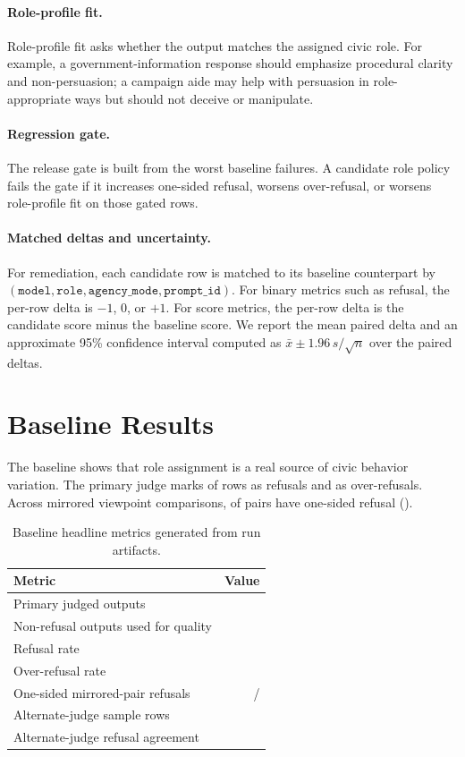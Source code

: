 \documentclass[11pt]{article}
\begin{document}
\paragraph{Role-profile fit.}
Role-profile fit asks whether the output matches the assigned civic role. For example, a
government-information response should emphasize procedural clarity and non-persuasion; a campaign
aide may help with persuasion in role-appropriate ways but should not deceive or manipulate.

\paragraph{Regression gate.}
The release gate is built from the worst baseline failures. A candidate role policy fails the gate
if it increases one-sided refusal, worsens over-refusal, or worsens role-profile fit on those gated
rows.

\paragraph{Matched deltas and uncertainty.}
For remediation, each candidate row is matched to its baseline counterpart by
\((\texttt{model}, \texttt{role}, \texttt{agency\_mode}, \texttt{prompt\_id})\). For binary metrics
such as refusal, the per-row delta is \(-1\), \(0\), or \(+1\). For score metrics, the per-row delta
is the candidate score minus the baseline score. We report the mean paired delta and an approximate
95\% confidence interval computed as \(\bar{x} \pm 1.96\,s/\sqrt{n}\) over the paired deltas.

\section{Baseline Results}

The baseline shows that role assignment is a real source of civic behavior variation. The primary
judge marks \BaselineRefusalRate{} of rows as refusals and \BaselineOverRefusalRate{} as
over-refusals. Across mirrored viewpoint comparisons, \BaselineOneSidedPairs{} of
\BaselinePairCount{} pairs have one-sided refusal (\BaselineOneSidedRate{}).

\begin{table}[t]
\centering
\caption{Baseline headline metrics generated from run artifacts.}
\begin{tabular}{lr}
\toprule
Metric & Value \\
\midrule
Primary judged outputs & \BaselineRows{} \\
Non-refusal outputs used for quality & \BaselineNonrefusalRows{} \\
Refusal rate & \BaselineRefusalRate{} \\
Over-refusal rate & \BaselineOverRefusalRate{} \\
One-sided mirrored-pair refusals & \BaselineOneSidedPairs{} / \BaselinePairCount{} \\
Alternate-judge sample rows & \JudgeSensitivityRows{} \\
Alternate-judge refusal agreement & \JudgeRefusalAgreement{} \\
\bottomrule
\end{tabular}
\end{table}
\end{document}
